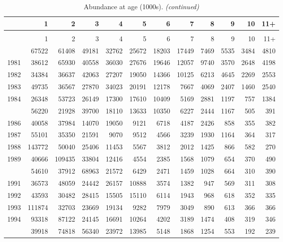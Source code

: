 \documentclass[
]{article}
\begin{document}
\begin{longtable}[t]{lrrrrrrrrrrr}
\caption{\label{tab:NAA-table}Abundance at age (1000s).}\\
\toprule
  & 1 & 2 & 3 & 4 & 5 & 6 & 7 & 8 & 9 & 10 & 11+\\
\midrule
\endfirsthead
\caption[]{Abundance at age (1000s). \textit{(continued)}}\\
\toprule
  & 1 & 2 & 3 & 4 & 5 & 6 & 7 & 8 & 9 & 10 & 11+\\
\midrule
\endhead

\endfoot
\bottomrule
\endlastfoot
1980 & 67522 & 61408 & 49181 & 32762 & 25672 & 18203 & 17449 & 7469 & 5535 & 3484 & 4810\\
1981 & 38612 & 65930 & 40558 & 36030 & 27676 & 19646 & 12057 & 9740 & 3570 & 2648 & 4198\\
1982 & 34384 & 36637 & 42063 & 27207 & 19050 & 14366 & 10125 & 6213 & 4645 & 2269 & 2553\\
1983 & 49735 & 36567 & 27870 & 34023 & 20191 & 12178 & 7667 & 4069 & 2407 & 1460 & 2540\\
1984 & 26348 & 53723 & 26149 & 17300 & 17610 & 10409 & 5169 & 2881 & 1197 & 757 & 1384\\
\addlinespace
1985 & 56220 & 21928 & 39700 & 18110 & 13633 & 10350 & 6227 & 2444 & 1167 & 505 & 391\\
1986 & 40058 & 37984 & 14070 & 19050 & 9121 & 6718 & 4187 & 2426 & 858 & 355 & 382\\
1987 & 55101 & 35350 & 21591 & 9070 & 9512 & 4566 & 3239 & 1930 & 1164 & 364 & 317\\
1988 & 143772 & 50040 & 25406 & 11453 & 5567 & 3812 & 2012 & 1425 & 866 & 582 & 270\\
1989 & 40666 & 109435 & 33804 & 12416 & 4554 & 2385 & 1568 & 1079 & 654 & 370 & 490\\
\addlinespace
1990 & 54610 & 37912 & 68963 & 21572 & 6429 & 2471 & 1459 & 1028 & 664 & 310 & 390\\
1991 & 36573 & 48059 & 24442 & 26157 & 10888 & 3574 & 1382 & 947 & 569 & 311 & 308\\
1992 & 43593 & 30482 & 28415 & 15505 & 15110 & 6114 & 1943 & 968 & 618 & 352 & 335\\
1993 & 111874 & 32703 & 23669 & 19134 & 9282 & 7979 & 3049 & 890 & 613 & 366 & 366\\
1994 & 93318 & 87122 & 24145 & 16691 & 10264 & 4202 & 3189 & 1474 & 408 & 319 & 346\\
\addlinespace
1995 & 39918 & 74818 & 56340 & 23972 & 13985 & 5148 & 1868 & 1254 & 553 & 192 & 239\\

\end{longtable}
\end{document}
